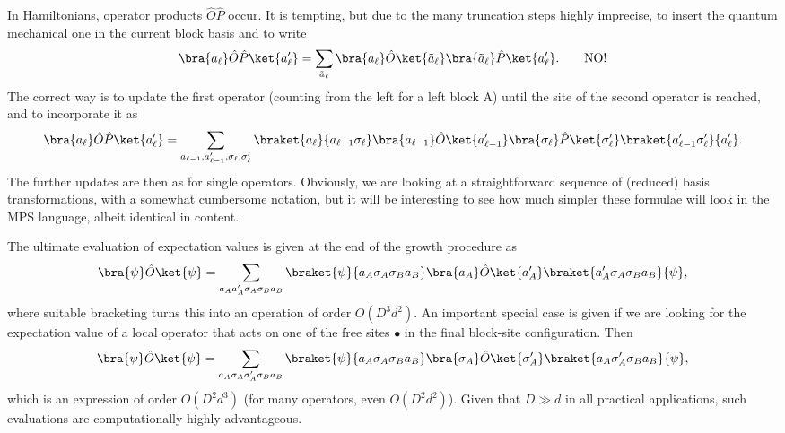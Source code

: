 In Hamiltonians, operator products $\hat{O}\hat{P}$ occur. It is tempting, but due to the many truncation steps highly imprecise, to insert the quantum mechanical one in the current block basis and to write
\begin{equation}
\bra{a_\ell} \hat{O}\hat{P} \ket{a'_\ell} = \sum_{\tilde{a}_\ell} \bra{a_\ell} \hat{O} \ket{\tilde{a}_\ell} \bra{\tilde{a}_\ell} \hat{P} \ket{a'_\ell} . \quad\quad {\rm NO!}
\end{equation}
The correct way is to update the first operator (counting from the left for a left block A) until the site of the second operator is reached, and to incorporate it as
\begin{equation}
\bra{a_\ell} \hat{O} \hat{P} \ket{a'_\ell} = \sum_{a_{\ell-1},a'_{\ell-1},\sigma_\ell,\sigma'_\ell}
\braket{a_\ell}{a_{\ell-1}\sigma_\ell}  \bra{a_{\ell-1}} \hat{O} \ket{a'_{\ell-1}} \bra{\sigma_\ell} \hat{P} \ket{\sigma'_\ell} \braket{a'_{\ell-1}\sigma'_\ell}{a'_\ell} .
\label{eq:incorporate}
\end{equation}
The further updates are then as for single operators. Obviously, we are looking at a straightforward sequence of (reduced) basis transformations, with a somewhat cumbersome notation, but it will be interesting to see how much simpler these formulae will look in the MPS language, albeit identical in content.


The ultimate evaluation of expectation values is given at the end of the growth procedure as 
\begin{equation}
\bra{\psi} \hat{O} \ket{\psi} = \sum_{a_A a'_A \sigma_A \sigma_B a_B} \braket{\psi}{a_A \sigma_A \sigma_B a_B} \bra{a_A} \hat{O} \ket{a'_A} \braket{a'_A \sigma_A \sigma_B a_B}{\psi},
\end{equation}
where suitable bracketing turns this into an operation of order $O(D^3 d^2)$. An important special case is given if we are looking for the expectation value of a local operator that acts on one of the free sites $\bullet$ in the final block-site configuration. Then 
\begin{equation}
\bra{\psi} \hat{O} \ket{\psi} = \sum_{a_A \sigma_A \sigma'_A \sigma_B a_B} \braket{\psi}{a_A \sigma_A \sigma_B a_B} \bra{\sigma_A} \hat{O} \ket{\sigma'_A} \braket{a_A \sigma'_A \sigma_B a_B}{\psi},
\end{equation}
which is an expression of order $O(D^2 d^3)$ (for many operators, even $O(D^2 d^2)$). Given that $D \gg d$ in all practical applications, such evaluations are computationally highly advantageous.

